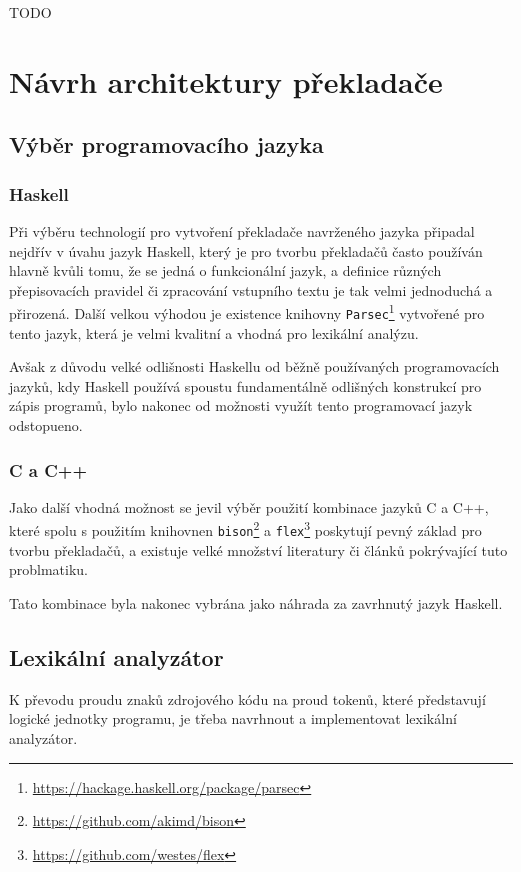 \documentclass[12pt, a4paper]{article}
\let\oldsection\section
\renewcommand\section{\clearpage\oldsection}
\begin{document}
\begin{huge}
TODO
\end{huge}

\section{Návrh architektury překladače}

\subsection{Výběr programovacího jazyka}
\subsubsection{Haskell}
Při výběru technologií pro vytvoření překladače navrženého jazyka připadal nejdřív v úvahu jazyk Haskell, který je pro tvorbu překladačů často používán hlavně kvůli tomu, že se jedná o funkcionální jazyk, a definice různých přepisovacích pravidel či zpracování vstupního textu je tak velmi jednoduchá a přirozená. Další velkou výhodou je existence knihovny \texttt{Parsec}\footnote{\url{https://hackage.haskell.org/package/parsec}} vytvořené pro tento jazyk, která je velmi kvalitní a vhodná pro lexikální analýzu.

 Avšak z důvodu velké odlišnosti Haskellu od běžně používaných programovacích jazyků, kdy Haskell používá spoustu fundamentálně odlišných konstrukcí pro zápis programů, bylo nakonec od možnosti využít tento programovací jazyk odstopueno.
 
\subsubsection{C a C++}
Jako další vhodná možnost se jevil výběr použití kombinace jazyků C a C++, které spolu s použitím knihovnen \texttt{bison}\footnote{\url{https://github.com/akimd/bison}} a \texttt{flex}\footnote{\url{https://github.com/westes/flex}} poskytují pevný základ pro tvorbu překladačů, a existuje velké množství literatury či článků pokrývající tuto problmatiku.

Tato kombinace byla nakonec vybrána jako náhrada za zavrhnutý jazyk Haskell.


\subsection{Lexikální analyzátor}

K převodu proudu znaků zdrojového kódu na proud tokenů, které představují logické jednotky programu, je třeba navrhnout a implementovat lexikální analyzátor. 
\end{document}
